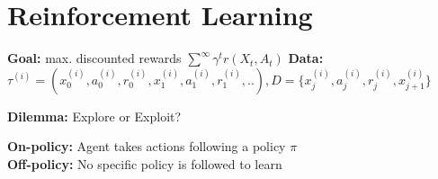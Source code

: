\begin{comment}
	\pagebreak
\end{comment}

\section{Reinforcement Learning}
\begin{comment}
	RL handles the case where we don't know the underlying MDP, e.g. we don't know the rewards and probabilities of the actions.\\
	\textbf{Goal:} Learn the mapping from actions (or a sequence of actions) to rewards and thus the MDP.\\
	\textbf{Credit assignment problem:} An agent must assign rewards to actions in a certain state. Which actions got me the largest reward?
\end{comment}

\textbf{Goal:} max. discounted rewards $\sum^\infty \gamma^t r(X_t, A_t)$
\textbf{Data:} $\tau^{(i)} = (x_0^{(i)}, a_0^{(i)}, r_0^{(i)}, x_1^{(i)}, a_1^{(i)}, r_1^{(i)},..), D=\{ x_j^{(i)}, a_j^{(i)}, r_j^{(i)}, x_{j+1}^{(i)} \}$\\
\begin{comment}
	Compared to supervised learning, the data is not i.i.d. and the dataset is not fixed, e.g. we generate it by interacting with our environment.\\
	\textbf{Episodic:} Creates multiple trajectories, resetting the agent.\\
\end{comment}
\textbf{Dilemma:} Explore or Exploit?\\
\begin{comment}
	Explore and gather more data to avoid missing out on a potentially large reward, or exploit and optimize the current policy ?\\
\end{comment}

\textbf{On-policy:} Agent takes actions following a policy $\pi$\\
\textbf{Off-policy:} No specific policy is followed to learn\\
\begin{comment}
	In on-policy learning, the agent follows the current policy when creating further trajectories.\\
	In off-policy learning, the agent uses trajectories to learn that are not following a specific policy, f.e. random actions, greedy max actions.\\
\end{comment}

